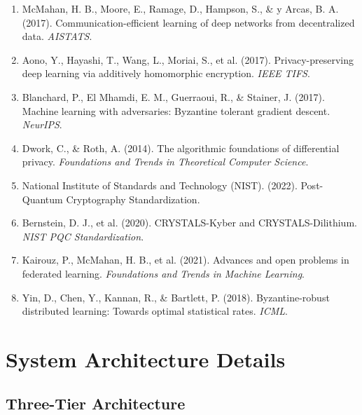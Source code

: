 \documentclass[12pt,a4paper]{article}
\begin{document}
\begin{enumerate}
    \item McMahan, H. B., Moore, E., Ramage, D., Hampson, S., \& y Arcas, B. A. (2017). Communication-efficient learning of deep networks from decentralized data. \textit{AISTATS}.
    
    \item Aono, Y., Hayashi, T., Wang, L., Moriai, S., et al. (2017). Privacy-preserving deep learning via additively homomorphic encryption. \textit{IEEE TIFS}.
    
    \item Blanchard, P., El Mhamdi, E. M., Guerraoui, R., \& Stainer, J. (2017). Machine learning with adversaries: Byzantine tolerant gradient descent. \textit{NeurIPS}.
    
    \item Dwork, C., \& Roth, A. (2014). The algorithmic foundations of differential privacy. \textit{Foundations and Trends in Theoretical Computer Science}.
    
    \item National Institute of Standards and Technology (NIST). (2022). Post-Quantum Cryptography Standardization.
    
    \item Bernstein, D. J., et al. (2020). CRYSTALS-Kyber and CRYSTALS-Dilithium. \textit{NIST PQC Standardization}.
    
    \item Kairouz, P., McMahan, H. B., et al. (2021). Advances and open problems in federated learning. \textit{Foundations and Trends in Machine Learning}.
    
    \item Yin, D., Chen, Y., Kannan, R., \& Bartlett, P. (2018). Byzantine-robust distributed learning: Towards optimal statistical rates. \textit{ICML}.
\end{enumerate}

\newpage
\appendix

\section{System Architecture Details}
\label{appendix:architecture}

\subsection{Three-Tier Architecture}
\end{document}
